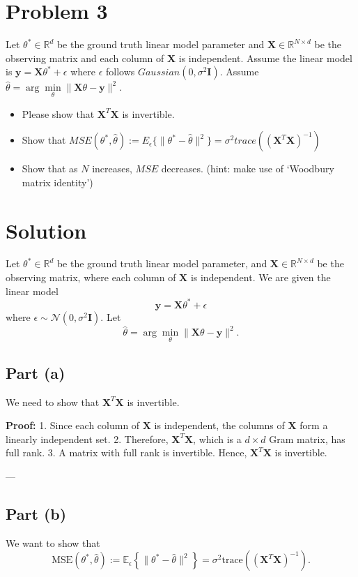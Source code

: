\documentclass[11pt]{article}
\newcommand{\R}{\mathbb{R}}
\newcommand{\mtx}[1]{\mathbf{#1}}
\newcommand{\vct}[1]{\mathbf{#1}}
\def \mI {\mtx{I}}
\def \mX {\mtx{X}}
\def \vy {\vct{y}}
\def \R {\mathbb{R}}
\begin{document}
	\section*{Problem 3}
	Let $\theta^*\in\R^d$ be the ground truth linear model parameter and $\mX\in\R^{N\times d}$ be the observing matrix and each column of $\mX$ is independent. Assume the linear model is $\vy=\mX\theta^*+\epsilon$ where $\epsilon$ follows $Gaussian(0,\sigma^2\mI)$. Assume $\hat{\theta}=\arg\min\limits_\theta \|\mX\theta-\vy\|^2$.
	\begin{itemize}
		\item Please show that $\mX^T\mX$ is invertible.
		\item Show that $MSE(\theta^*,\hat{\theta}):=E_\epsilon \{\|\theta^*-\hat{\theta}\|^2\}=\sigma^2 trace((\mX^T\mX)^{-1})$
		\item Show that as $N$ increases, $MSE$ decreases. (hint: make use of `Woodbury matrix identity')
	\end{itemize} 

	\section*{Solution}

	Let $\theta^* \in \mathbb{R}^d$ be the ground truth linear model parameter, and $\mathbf{X} \in \mathbb{R}^{N \times d}$ be the observing matrix, where each column of $\mathbf{X}$ is independent. We are given the linear model 
	\[
	\mathbf{y} = \mathbf{X} \theta^* + \epsilon
	\] 
	where $\epsilon \sim \mathcal{N}(0, \sigma^2 \mathbf{I})$. Let 
	\[
	\hat{\theta} = \arg\min_{\theta} \|\mathbf{X} \theta - \mathbf{y}\|^2.
	\]
	
	\subsection*{Part (a)}
	We need to show that $\mathbf{X}^T \mathbf{X}$ is invertible.
	
	\textbf{Proof:}
	1. Since each column of $\mathbf{X}$ is independent, the columns of $\mathbf{X}$ form a linearly independent set.
	2. Therefore, $\mathbf{X}^T \mathbf{X}$, which is a $d \times d$ Gram matrix, has full rank.
	3. A matrix with full rank is invertible. Hence, $\mathbf{X}^T \mathbf{X}$ is invertible.
	
	---
	
	\subsection*{Part (b)}
	We want to show that 
	\[
	\text{MSE}(\theta^*, \hat{\theta}) := \mathbb{E}_\epsilon \left\{ \|\theta^* - \hat{\theta}\|^2 \right\} = \sigma^2 \text{trace}((\mathbf{X}^T \mathbf{X})^{-1}).
	\]
	
\end{document}
